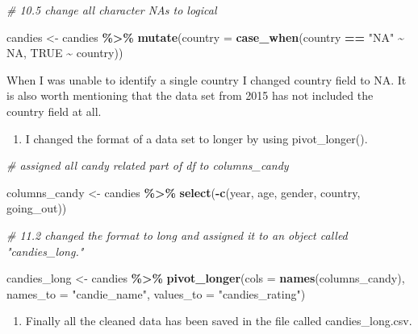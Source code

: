 \documentclass[
]{article}
\newenvironment{Shaded}{\begin{snugshade}}{\end{snugshade}}
\newcommand{\AttributeTok}[1]{\textcolor[rgb]{0.13,0.29,0.53}{#1}}
\newcommand{\CommentTok}[1]{\textcolor[rgb]{0.56,0.35,0.01}{\textit{#1}}}
\newcommand{\ConstantTok}[1]{\textcolor[rgb]{0.56,0.35,0.01}{#1}}
\newcommand{\FunctionTok}[1]{\textcolor[rgb]{0.13,0.29,0.53}{\textbf{#1}}}
\newcommand{\NormalTok}[1]{#1}
\newcommand{\OtherTok}[1]{\textcolor[rgb]{0.56,0.35,0.01}{#1}}
\newcommand{\SpecialCharTok}[1]{\textcolor[rgb]{0.81,0.36,0.00}{\textbf{#1}}}
\newcommand{\StringTok}[1]{\textcolor[rgb]{0.31,0.60,0.02}{#1}}
\providecommand{\tightlist}{%
  \setlength{\itemsep}{0pt}\setlength{\parskip}{0pt}}
\begin{document}
\begin{Shaded}
\begin{Highlighting}[]
\CommentTok{\# 10.5 change all character \textquotesingle{}NA\textquotesingle{}s to logical}

\NormalTok{candies }\OtherTok{\textless{}{-}}\NormalTok{ candies }\SpecialCharTok{\%\textgreater{}\%} 
  \FunctionTok{mutate}\NormalTok{(}\AttributeTok{country =} \FunctionTok{case\_when}\NormalTok{(country }\SpecialCharTok{==} \StringTok{"NA"} \SpecialCharTok{\textasciitilde{}} \ConstantTok{NA}\NormalTok{,}
                             \ConstantTok{TRUE}     \SpecialCharTok{\textasciitilde{}}\NormalTok{ country))}
\end{Highlighting}
\end{Shaded}

When I was unable to identify a single country I changed country field
to NA. It is also worth mentioning that the data set from 2015 has not
included the country field at all.

\begin{enumerate}
\def\labelenumi{\arabic{enumi}.}
\setcounter{enumi}{3}
\tightlist
\item
  I changed the format of a data set to longer by using pivot\_longer().
\end{enumerate}

\begin{Shaded}
\begin{Highlighting}[]
\CommentTok{\# assigned all candy related part of df to columns\_candy}

\NormalTok{columns\_candy }\OtherTok{\textless{}{-}}\NormalTok{ candies }\SpecialCharTok{\%\textgreater{}\%} \FunctionTok{select}\NormalTok{(}\SpecialCharTok{{-}}\FunctionTok{c}\NormalTok{(year, age, gender, country, going\_out))}

\CommentTok{\# 11.2 changed the format to long and assigned it to an object called "candies\_long." }

\NormalTok{candies\_long }\OtherTok{\textless{}{-}}\NormalTok{ candies }\SpecialCharTok{\%\textgreater{}\%} 
  \FunctionTok{pivot\_longer}\NormalTok{(}\AttributeTok{cols =} \FunctionTok{names}\NormalTok{(columns\_candy), }
               \AttributeTok{names\_to =} \StringTok{"candie\_name"}\NormalTok{, }
               \AttributeTok{values\_to =} \StringTok{"candies\_rating"}\NormalTok{)}
\end{Highlighting}
\end{Shaded}

\begin{enumerate}
\def\labelenumi{\arabic{enumi}.}
\setcounter{enumi}{4}
\tightlist
\item
  Finally all the cleaned data has been saved in the file called
  candies\_long.csv.
\end{enumerate}
\end{document}
